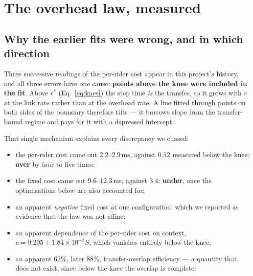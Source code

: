 %
%

\section{The overhead law, measured}
\label{app:ridercost}

\subsection{Why the earlier fits were wrong, and in which direction}

Three successive readings of the per-rider cost appear in this project's history,
and all three errors have one cause: \textbf{points above the knee were included in
the fit}. Above $r^{*}$ (Eq.~\ref{eq:knee}) the step time \emph{is} the transfer, so
it grows with $r$ at the link rate rather than at the overhead rate. A line fitted
through points on both sides of the boundary therefore tilts --- it borrows slope
from the transfer-bound regime and pays for it with a depressed intercept.

That single mechanism explains every discrepancy we chased:

\begin{itemize}\itemsep1pt \parskip0pt
\item the per-rider cost came out $2.2$--$2.9$\,ms, against $0.52$ measured below
  the knee: \textbf{over} by four to five times;
\item the fixed cost came out $9.6$--$12.3$\,ms, against $3.4$: \textbf{under},
  once the optimisations below are also accounted for;
\item an apparent \emph{negative} fixed cost at one configuration, which we
  reported as evidence that the law was not affine;
\item an apparent dependence of the per-rider cost on context,
  $c = 0.205 + 1.84\times10^{-3}S$, which vanishes entirely below the knee;
\item an apparent $62\%$, later $88\%$, transfer-overlap efficiency --- a quantity
  that does not exist, since below the knee the overlap is complete.
\end{itemize}

